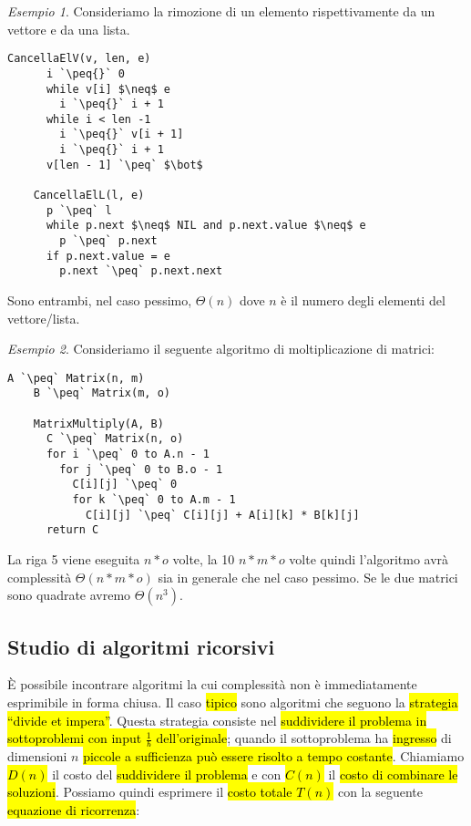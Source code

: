 \documentclass[a4paper,11pt,twoside]{article}
\theoremstyle{plain}
\theoremstyle{definition}
\theoremstyle{remark}
\newtheorem{esempio}{Esempio}[section]
\newcommand{\peq}{$\gets$}
\begin{document}
\begin{esempio}
  Consideriamo la rimozione di un elemento rispettivamente da un vettore e da
  una lista.

  \begin{lstlisting}[language=pseudocodice,gobble=4]
    CancellaElV(v, len, e)
      i `\peq{}` 0
      while v[i] $\neq$ e
        i `\peq{}` i + 1
      while i < len -1
        i `\peq{}` v[i + 1]
        i `\peq{}` i + 1
      v[len - 1] `\peq` $\bot$

    CancellaElL(l, e)
      p `\peq` l
      while p.next $\neq$ NIL and p.next.value $\neq$ e
        p `\peq` p.next
      if p.next.value = e
        p.next `\peq` p.next.next
  \end{lstlisting}

  Sono entrambi, nel caso pessimo, $\Theta(n)$ dove $n$ è il numero degli
  elementi del vettore/lista.
\end{esempio}
\begin{esempio}
  Consideriamo il seguente algoritmo di moltiplicazione di matrici:

  \begin{lstlisting}[language=pseudocodice,gobble=4]
    A `\peq` Matrix(n, m)
    B `\peq` Matrix(m, o)

    MatrixMultiply(A, B)
      C `\peq` Matrix(n, o)
      for i `\peq` 0 to A.n - 1
        for j `\peq` 0 to B.o - 1
          C[i][j] `\peq` 0
          for k `\peq` 0 to A.m - 1
            C[i][j] `\peq` C[i][j] + A[i][k] * B[k][j]
      return C
  \end{lstlisting}

  La riga 5 viene eseguita $n*o$ volte, la 10 $n*m*o$ volte quindi l'algoritmo
  avrà complessità $\Theta(n*m*o)$ sia in generale che nel caso pessimo. Se le
  due matrici sono quadrate avremo $\Theta(n^3)$.
\end{esempio}

\subsection{Studio di algoritmi ricorsivi}\label{sec:alg-ricorsivi}

È possibile incontrare algoritmi la cui complessità non è immediatamente
esprimibile in forma chiusa. Il caso \hl{tipico} sono algoritmi che seguono la
\hl{strategia ``divide et impera''}. Questa strategia consiste nel
\hl{suddividere il problema in sottoproblemi con input $\frac{1}{b}$
dell'originale}; quando il sottoproblema ha \hl{ingresso} di dimensioni $n$
\hl{piccole a sufficienza può essere risolto a tempo costante}. Chiamiamo
\hl{$D(n)$} il costo del \hl{suddividere il problema} e con \hl{$C(n)$} il
\hl{costo di combinare le soluzioni}. Possiamo quindi esprimere il \hl{costo
totale $T(n)$} con la seguente \hl{equazione di ricorrenza}:
\end{document}

